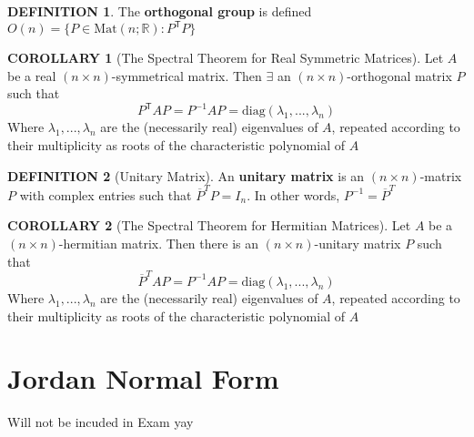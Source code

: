 \documentclass[12pt]{article}
\theoremstyle{definition}
\newtheorem{definition}{DEFINITION}[subsection]
\newcommand{\Mat}{\text{Mat}}
\newcommand{\transpose}[1]{#1^\mathsf{T}}
\newtheorem{corollary}{COROLLARY}[subsection]
\begin{document}
\begin{definition}
    The \textbf{orthogonal group} is defined $O(n) = \{P \in \Mat(n;\mathbb{R}): \transpose{P}P\}$
\end{definition}

\begin{corollary}[The Spectral Theorem for Real Symmetric Matrices]
    Let $A$ be a real $(n \times n)$-symmetrical matrix. Then $\exists$ an $(n \times n)$-orthogonal matrix $P$ such that
    $$\transpose{P}AP = P^{-1}AP = \text{diag}(\lambda_1,..., \lambda_n)$$
    Where $\lambda_1, ..., \lambda_n$ are the (necessarily real) eigenvalues of $A$, repeated according to their multiplicity as roots of the characteristic polynomial of $A$
\end{corollary}

\begin{definition}[Unitary Matrix]
    An \textbf{unitary matrix} is an $(n \times n)$-matrix $P$ with complex entries such that $\overline{P}^TP = I_n$. In other words, $P^{-1} = \overline{P}^T$ 
\end{definition}

\begin{corollary}[The Spectral Theorem for Hermitian Matrices]
    Let $A$ be a $(n\times n)$-hermitian matrix. Then there is an $(n \times n)$-unitary matrix $P$ such that
    $$\overline{P}^TAP = P^{-1}AP = \text{diag}(\lambda_1,..., \lambda_n)$$
    Where $\lambda_1, ..., \lambda_n$ are the (necessarily real) eigenvalues of $A$, repeated according to their multiplicity as roots of the characteristic polynomial of $A$
\end{corollary}


\section{Jordan Normal Form}
Will not be incuded in  Exam yay

\end{document}
